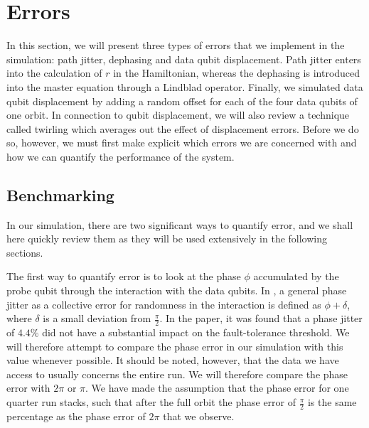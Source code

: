 \section{Errors} \label{sec:errors}
In this section, we will present three types of errors that we implement in the simulation: path jitter, dephasing and data qubit displacement. Path jitter enters into the calculation of $r$ in the Hamiltonian, whereas the dephasing is introduced into the master equation through a Lindblad operator. Finally, we simulated data qubit displacement by adding a random offset for each of the four data qubits of one orbit. In connection to qubit displacement, we will also review a technique called twirling which averages out the effect of displacement errors. Before we do so, however, we must first make explicit which errors we are concerned with and how we can quantify the performance of the system. 


\subsection{Benchmarking}
In our simulation, there are two significant 	ways to quantify error, and we shall here quickly review them as they will be used extensively in the following sections.

The first way to quantify error is to look at the phase $\phi$ accumulated by the probe qubit through the interaction with the data qubits. In \cite{OGorman2016}, a general phase jitter as a collective error for randomness in the interaction is defined as $\phi + \delta$, where $\delta$ is a small deviation from $\frac{\pi}{2}$.  In the paper, it was found that a phase jitter of $4.4 \%$ did not have a substantial impact on the fault-tolerance threshold. We will therefore attempt to compare the phase error in our simulation with this value whenever possible. It should be noted, however, that the data we have access to usually concerns the entire run. We will therefore compare the phase error with $2\pi$ or $\pi$. We have made the assumption that the phase error for one quarter run stacks, such that after the full orbit the phase error of $\frac{\pi}{2}$ is the same percentage as the phase error of $2\pi$ that we observe. 

